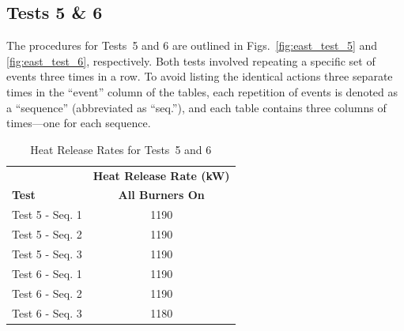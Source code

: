 \documentclass[12pt,oneside]{book}
\begin{document}
\clearpage

\subsection{Tests 5 \& 6}
The procedures for Tests~5 and 6 are outlined in Figs.~\ref{fig:east_test_5} and \ref{fig:east_test_6}, respectively. Both tests involved repeating a specific set of events three times in a row. To avoid listing the identical actions three separate times in the ``event'' column of the tables, each repetition of events is denoted as a ``sequence'' (abbreviated as ``seq.''), and each table contains three columns of times---one for each sequence.  

\begin{table}[!ht]
\caption{Heat Release Rates for Tests~5 and 6}
\begin{tabular}{lc}
 \toprule
 & \textbf{Heat Release Rate (kW)} \\
\textbf{Test} & \textbf{All Burners On} \\
\midrule
Test 5 - Seq. 1		& 1190 \\
Test 5 - Seq. 2		& 1190 \\
Test 5 - Seq. 3		& 1190 \\
Test 6 - Seq. 1		& 1190 \\
Test 6 - Seq. 2		& 1190 \\
Test 6 - Seq. 3		& 1180 \\
\bottomrule
\end{tabular}
\label{table:HRR_Tests_5-6}
\end{table}
\end{document}
